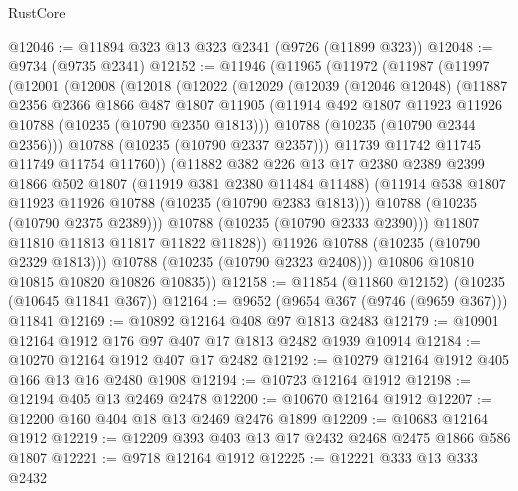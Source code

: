 \begin{lexlean}{RustCore}
\begin{coremodule}
@12046 := @11894 @323 @13 @323 @2341 (@9726 (@11899 @323))
@12048 := @9734 (@9735 @2341)
@12152 := @11946
    (@11965
      (@11972
        (@11987
          (@11997
            (@12001
              (@12008
                (@12018
                  (@12022
                    (@12029
                      (@12039
                        (@12046 @12048)
                        (@11887
                          @2356
                          @2366
                          @1866
                          @487
                          @1807
                          @11905
                          (@11914 @492 @1807 @11923 @11926 @10788 (@10235 (@10790 @2350 @1813)))
                          @10788
                          (@10235 (@10790 @2344 @2356)))
                        @10788
                        (@10235 (@10790 @2337 @2357)))
                      @11739
                      @11742
                      @11745
                      @11749
                      @11754
                      @11760))
                  (@11882
                    @382
                    @226
                    @13
                    @17
                    @2380
                    @2389
                    @2399
                    @1866
                    @502
                    @1807
                    (@11919 @381 @2380 @11484 @11488)
                    (@11914 @538 @1807 @11923 @11926 @10788 (@10235 (@10790 @2383 @1813)))
                    @10788
                    (@10235 (@10790 @2375 @2389)))
                  @10788
                  (@10235 (@10790 @2333 @2390)))
                @11807
                @11810
                @11813
                @11817
                @11822
                @11828))
            @11926
            @10788
            (@10235 (@10790 @2329 @1813)))
          @10788
          (@10235 (@10790 @2323 @2408)))
        @10806
        @10810
        @10815
        @10820
        @10826
        @10835))
@12158 := @11854 (@11860 @12152) (@10235 (@10645 @11841 @367))
@12164 := @9652 (@9654 @367 (@9746 (@9659 @367))) @11841
@12169 := @10892 @12164 @408 @97 @1813 @2483
@12179 := @10901 @12164 @1912 @176 @97 @407 @17 @1813 @2482 @1939 @10914
@12184 := @10270 @12164 @1912 @407 @17 @2482
@12192 := @10279 @12164 @1912 @405 @166 @13 @16 @2480 @1908
@12194 := @10723 @12164 @1912
@12198 := @12194 @405 @13 @2469 @2478
@12200 := @10670 @12164 @1912
@12207 := @12200 @160 @404 @18 @13 @2469 @2476 @1899
@12209 := @10683 @12164 @1912
@12219 := @12209 @393 @403 @13 @17 @2432 @2468 @2475 @1866 @586 @1807
@12221 := @9718 @12164 @1912
@12225 := @12221 @333 @13 @333 @2432

\end{coremodule}
\end{lexlean}
